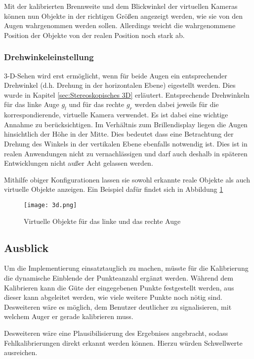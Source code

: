 %
Mit der kalibrierten Brennweite und dem Blickwinkel der virtuellen Kameras können nun Objekte in der richtigen Größen angezeigt werden, wie sie von den Augen wahrgenommen werden sollen. Allerdings weicht die wahrgenommene Position der Objekte von der realen Position noch stark ab. 

\subsubsection{Drehwinkeleinstellung}
3-D-Sehen wird erst ermöglicht, wenn für beide Augen ein entsprechender Drehwinkel (d.h. Drehung in der horizontalen Ebene) eigestellt werden. Dies wurde in Kapitel \ref{sec:Stereoskopisches 3D} erläutert.  Entsprechende Drehwinkeln für das linke Auge $g_{l}$ und für das rechte $g_{r}$ werden dabei jeweils für die korrespondierende, virtuelle Kamera verwendet.
Es ist dabei eine wichtige Annahme zu berücksichtigen. Im Verhältnis zum Brillendisplay liegen die Augen hinsichtlich der Höhe in der Mitte. Dies bedeutet dass eine Betrachtung der Drehung des Winkels in der vertikalen Ebene ebenfalls notwendig ist. Dies ist in realen Anwendungen nicht zu vernachlässigen und darf auch deshalb in späteren Entwicklungen nicht außer Acht gelassen werden.

Mithilfe obiger Konfigurationen lassen sie sowohl erkannte reale Objekte als auch virtuelle Objekte anzeigen.  Ein Beispiel dafür findet sich in Abbildung \ref{fig:Virtuelle Quadrate aus Prezi}

\begin{figure}[h]
   \centering
   \texttt{[image: 3d.png]}
   \caption{Virtuelle Objekte für das linke und das rechte Auge}
   \label{fig:Virtuelle Quadrate aus Prezi}
\end{figure}

\subsection{Ausblick}
Um die Implementierung einsatztauglich zu machen, müsste für die Kalibrierung die dynamische Einblende der Punkteanzahl ergänzt werden. Während dem Kalibrieren kann die Güte der eingegebenen Punkte festgestellt werden, aus dieser kann abgeleitet werden, wie viele weitere Punkte noch nötig sind. Desweiteren wäre es möglich, dem Benutzer deutlicher zu signalisieren, mit welchem Auger er gerade kalibrieren muss.

Desweiteren wäre eine Plausibilisierung des Ergebnises angebracht, sodass Fehlkalibrierungen direkt erkannt werden können. Hierzu würden Schwellwerte ausreichen.

